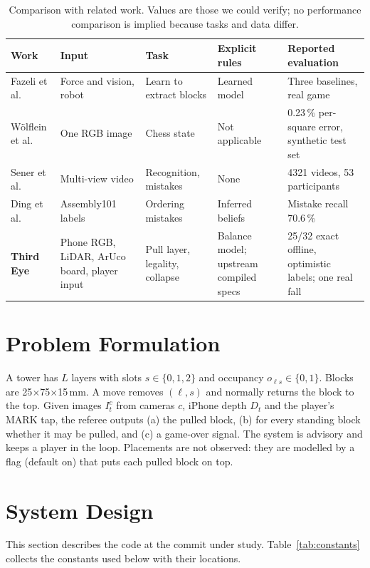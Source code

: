 \documentclass[conference,10pt]{IEEEtran}
\begin{document}
\begin{table}[!t]
\caption{Comparison with related work. Values are those we could verify; no performance comparison is implied because tasks and data differ.}\label{tab:related}
\centering\footnotesize
\begin{tabular}{@{}p{2.3cm}p{3.2cm}p{3.1cm}p{2.4cm}p{5.6cm}@{}}
\toprule
Work & Input & Task & Explicit rules & Reported evaluation \\
\midrule
Fazeli et al.~\cite{fazeli2019} & Force and vision, robot & Learn to extract blocks & Learned model & Three baselines, real game \\
Wölflein et al.~\cite{wolflein2021} & One RGB image & Chess state & Not applicable & 0.23\,\% per-square error, synthetic test set \\
Sener et al.~\cite{sener2022} & Multi-view video & Recognition, mistakes & None & 4321 videos, 53 participants \\
Ding et al.~\cite{ding2023} & Assembly101 labels & Ordering mistakes & Inferred beliefs & Mistake recall 70.6\,\% \\
\textbf{Third Eye} & Phone RGB, LiDAR, ArUco board, player input & Pull layer, legality, collapse & Balance model; upstream compiled specs & 25/32 exact offline, optimistic labels; one real fall \\
\bottomrule
\end{tabular}
\end{table}

\section{Problem Formulation}\label{sec:problem}
A tower has $L$ layers with slots $s\in\{0,1,2\}$ and occupancy $o_{\ell s}\in\{0,1\}$. Blocks are 25$\times$75$\times$15\,mm. A move removes $(\ell,s)$ and normally returns the block to the top. Given images $I^c_t$ from cameras $c$, iPhone depth $D_t$ and the player's MARK tap, the referee outputs (a) the pulled block, (b) for every standing block whether it may be pulled, and (c) a game-over signal. The system is advisory and keeps a player in the loop. Placements are not observed: they are modelled by a flag (default on) that puts each pulled block on top.

\section{System Design}\label{sec:design}
This section describes the code at the commit under study. Table~\ref{tab:constants} collects the constants used below with their locations.
\end{document}
